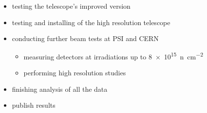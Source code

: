 \begin{itemize}
  \item testing the telescope's improved version
  \item testing and installing of the high resolution telescope
  \item conducting further beam tests at \ac{PSI} and CERN
  \begin{itemize}
		\item measuring detectors at irradiations up to \SI{8e15}{n\per\centi\meter^2}
		\item performing high resolution studies
  \end{itemize}
  \item finishing analysis of all the data
  \item publish results
\end{itemize}
\parend